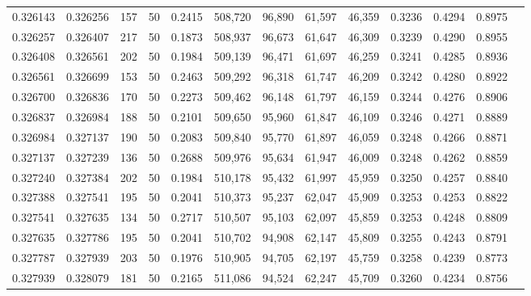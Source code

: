 \begin{tabular}{rrrrrrrrrrrrr}
0.326143 & 0.326256 &   157 &  50 &                                     0.2415 & 508,720 &  96,890 &  61,597 &  46,359 & 0.3236 & 0.4294 & 0.8975 \\
0.326257 & 0.326407 &   217 &  50 &                                     0.1873 & 508,937 &  96,673 &  61,647 &  46,309 & 0.3239 & 0.4290 & 0.8955 \\
0.326408 & 0.326561 &   202 &  50 &                                     0.1984 & 509,139 &  96,471 &  61,697 &  46,259 & 0.3241 & 0.4285 & 0.8936 \\
0.326561 & 0.326699 &   153 &  50 &                                     0.2463 & 509,292 &  96,318 &  61,747 &  46,209 & 0.3242 & 0.4280 & 0.8922 \\
0.326700 & 0.326836 &   170 &  50 &                                     0.2273 & 509,462 &  96,148 &  61,797 &  46,159 & 0.3244 & 0.4276 & 0.8906 \\
0.326837 & 0.326984 &   188 &  50 &                                     0.2101 & 509,650 &  95,960 &  61,847 &  46,109 & 0.3246 & 0.4271 & 0.8889 \\
0.326984 & 0.327137 &   190 &  50 &                                     0.2083 & 509,840 &  95,770 &  61,897 &  46,059 & 0.3248 & 0.4266 & 0.8871 \\
0.327137 & 0.327239 &   136 &  50 &                                     0.2688 & 509,976 &  95,634 &  61,947 &  46,009 & 0.3248 & 0.4262 & 0.8859 \\
0.327240 & 0.327384 &   202 &  50 &                                     0.1984 & 510,178 &  95,432 &  61,997 &  45,959 & 0.3250 & 0.4257 & 0.8840 \\
0.327388 & 0.327541 &   195 &  50 &                                     0.2041 & 510,373 &  95,237 &  62,047 &  45,909 & 0.3253 & 0.4253 & 0.8822 \\
0.327541 & 0.327635 &   134 &  50 &                                     0.2717 & 510,507 &  95,103 &  62,097 &  45,859 & 0.3253 & 0.4248 & 0.8809 \\
0.327635 & 0.327786 &   195 &  50 &                                     0.2041 & 510,702 &  94,908 &  62,147 &  45,809 & 0.3255 & 0.4243 & 0.8791 \\
0.327787 & 0.327939 &   203 &  50 &                                     0.1976 & 510,905 &  94,705 &  62,197 &  45,759 & 0.3258 & 0.4239 & 0.8773 \\
0.327939 & 0.328079 &   181 &  50 &                                     0.2165 & 511,086 &  94,524 &  62,247 &  45,709 & 0.3260 & 0.4234 & 0.8756 \\

\end{tabular}
